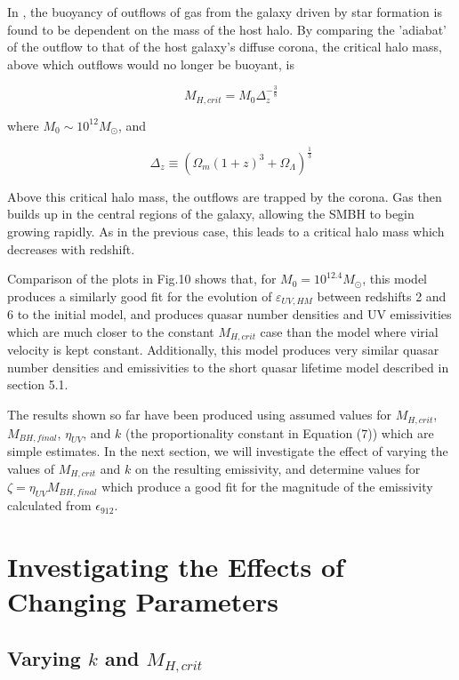 \documentclass[12pt, twocolumn]{report}%
\begin{document}
In \cite{Quasar}, the buoyancy of outflows of gas from the galaxy driven by star formation is found to be dependent on the mass of the host halo. By comparing the 'adiabat' of the outflow to that of the host galaxy's diffuse corona, the critical halo mass, above which outflows would no longer be buoyant, is

\begin{equation}
    M_{H,crit}=M_0\Delta_z^{-\frac{3}{8}}
\end{equation}

\noindent where $M_0\sim10^{12}M_\odot$, and

\begin{equation}
    \Delta_z\equiv(\Omega_m(1+z)^3+\Omega_\Lambda)^{\frac{1}{3}}
\end{equation}

\noindent Above this critical halo mass, the outflows are trapped by the corona. Gas then builds up in the central regions of the galaxy, allowing the SMBH to begin growing rapidly. As in the previous case, this leads to a critical halo mass which decreases with redshift.\par

Comparison of the plots in Fig.10 shows that, for $M_0=10^{12.4}M_\odot$, this model produces a similarly good fit for the evolution of $\varepsilon_{UV,HM}$ between redshifts 2 and 6 to the initial model, and produces quasar number densities and UV emissivities which are much closer to the constant $M_{H,crit}$ case than the model where virial velocity is kept constant. Additionally, this model produces very similar quasar number densities and emissivities to the short quasar lifetime model described in section 5.1.

 The results shown so far have been produced using assumed values for $M_{H,crit}$, $M_{BH,final}$, $\eta_{UV}$, and $k$ (the proportionality constant in Equation (7)) which are simple estimates. In the next section, we will investigate the effect of varying the values of $M_{H,crit}$ and $k$ on the resulting emissivity, and determine values for $\zeta=\eta_{UV}M_{BH,final}$ which produce a good fit for the magnitude of the emissivity calculated from $\epsilon_{912}$.

 \section{Investigating the Effects of Changing Parameters}
 \subsection{Varying $k$ and $M_{H,crit}$}
\end{document}
